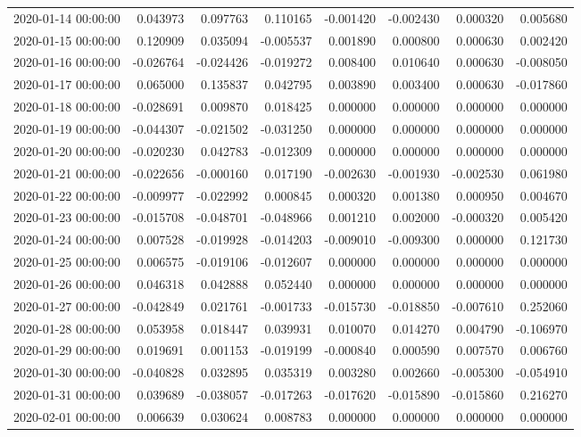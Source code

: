 \begin{tabular}{lrrrrrrr}
2020-01-14 00:00:00 & 0.043973 & 0.097763 & 0.110165 & -0.001420 & -0.002430 & 0.000320 & 0.005680 \\
2020-01-15 00:00:00 & 0.120909 & 0.035094 & -0.005537 & 0.001890 & 0.000800 & 0.000630 & 0.002420 \\
2020-01-16 00:00:00 & -0.026764 & -0.024426 & -0.019272 & 0.008400 & 0.010640 & 0.000630 & -0.008050 \\
2020-01-17 00:00:00 & 0.065000 & 0.135837 & 0.042795 & 0.003890 & 0.003400 & 0.000630 & -0.017860 \\
2020-01-18 00:00:00 & -0.028691 & 0.009870 & 0.018425 & 0.000000 & 0.000000 & 0.000000 & 0.000000 \\
2020-01-19 00:00:00 & -0.044307 & -0.021502 & -0.031250 & 0.000000 & 0.000000 & 0.000000 & 0.000000 \\
2020-01-20 00:00:00 & -0.020230 & 0.042783 & -0.012309 & 0.000000 & 0.000000 & 0.000000 & 0.000000 \\
2020-01-21 00:00:00 & -0.022656 & -0.000160 & 0.017190 & -0.002630 & -0.001930 & -0.002530 & 0.061980 \\
2020-01-22 00:00:00 & -0.009977 & -0.022992 & 0.000845 & 0.000320 & 0.001380 & 0.000950 & 0.004670 \\
2020-01-23 00:00:00 & -0.015708 & -0.048701 & -0.048966 & 0.001210 & 0.002000 & -0.000320 & 0.005420 \\
2020-01-24 00:00:00 & 0.007528 & -0.019928 & -0.014203 & -0.009010 & -0.009300 & 0.000000 & 0.121730 \\
2020-01-25 00:00:00 & 0.006575 & -0.019106 & -0.012607 & 0.000000 & 0.000000 & 0.000000 & 0.000000 \\
2020-01-26 00:00:00 & 0.046318 & 0.042888 & 0.052440 & 0.000000 & 0.000000 & 0.000000 & 0.000000 \\
2020-01-27 00:00:00 & -0.042849 & 0.021761 & -0.001733 & -0.015730 & -0.018850 & -0.007610 & 0.252060 \\
2020-01-28 00:00:00 & 0.053958 & 0.018447 & 0.039931 & 0.010070 & 0.014270 & 0.004790 & -0.106970 \\
2020-01-29 00:00:00 & 0.019691 & 0.001153 & -0.019199 & -0.000840 & 0.000590 & 0.007570 & 0.006760 \\
2020-01-30 00:00:00 & -0.040828 & 0.032895 & 0.035319 & 0.003280 & 0.002660 & -0.005300 & -0.054910 \\
2020-01-31 00:00:00 & 0.039689 & -0.038057 & -0.017263 & -0.017620 & -0.015890 & -0.015860 & 0.216270 \\
2020-02-01 00:00:00 & 0.006639 & 0.030624 & 0.008783 & 0.000000 & 0.000000 & 0.000000 & 0.000000 \\

\end{tabular}
